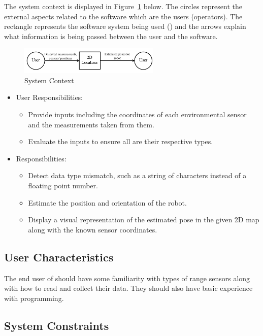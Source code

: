 \documentclass[12pt]{article}
\begin{document}
The system context is displayed in Figure~\ref{Fig_SystemContext} below. The circles represent the external aspects related to the software which are the users (operators). The rectangle represents the software system being used (\progname) and the arrows explain what information is being passed between the user and the software.

\begin{figure}[h!]
\begin{center}
 \includegraphics[width=0.6\textwidth]{SystemContextFigure.png}
\caption{System Context}
\label{Fig_SystemContext} 
\end{center}
\end{figure}
\begin{itemize}
\item User Responsibilities:
\begin{itemize}
\item Provide inputs including the coordinates of each environmental sensor and the measurements taken from them.
\item Evaluate the inputs to ensure all are their respective types.
\end{itemize}
\item \progname Responsibilities:
\begin{itemize} 
\item Detect data type mismatch, such as a string of characters instead of a
  floating point number.
\item Estimate the position and orientation of the robot.
\item Display a visual representation of the estimated pose in the given 2D map along with the known sensor coordinates.
\end{itemize}
\end{itemize}

\subsection{User Characteristics}\label{SecUserCharacteristics}

The end user of \progname should have some familiarity with types of range sensors along with how to read and collect their data. They should also have basic experience with programming.

\subsection{System Constraints}
\end{document}
